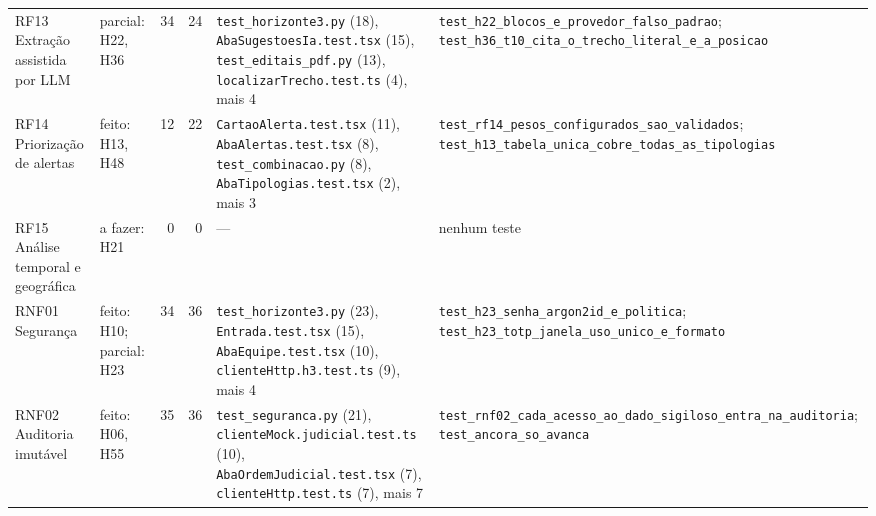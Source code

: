 \begin{scriptsize}
\begin{longtable}{>{\raggedright\arraybackslash}p{2.5cm}>{\raggedright\arraybackslash}p{1.9cm}rr>{\raggedright\arraybackslash}p{3.3cm}>{\raggedright\arraybackslash}p{4.5cm}}
RF13 Extração assistida por LLM & parcial: H22, H36 & 34 & 24 & \texttt{test\_\allowbreak{}horizonte3.\allowbreak{}py} (18), \texttt{AbaSugestoesIa.\allowbreak{}test.\allowbreak{}tsx} (15), \texttt{test\_\allowbreak{}editais\_\allowbreak{}pdf.\allowbreak{}py} (13), \texttt{localizarTrecho.\allowbreak{}test.\allowbreak{}ts} (4), mais 4 & \texttt{test\_\allowbreak{}h22\_\allowbreak{}blocos\_\allowbreak{}e\_\allowbreak{}provedor\_\allowbreak{}falso\_\allowbreak{}padrao}; \texttt{test\_\allowbreak{}h36\_\allowbreak{}t10\_\allowbreak{}cita\_\allowbreak{}o\_\allowbreak{}trecho\_\allowbreak{}literal\_\allowbreak{}e\_\allowbreak{}a\_\allowbreak{}posicao} \\
RF14 Priorização de alertas & feito: H13, H48 & 12 & 22 & \texttt{CartaoAlerta.\allowbreak{}test.\allowbreak{}tsx} (11), \texttt{AbaAlertas.\allowbreak{}test.\allowbreak{}tsx} (8), \texttt{test\_\allowbreak{}combinacao.\allowbreak{}py} (8), \texttt{AbaTipologias.\allowbreak{}test.\allowbreak{}tsx} (2), mais 3 & \texttt{test\_\allowbreak{}rf14\_\allowbreak{}pesos\_\allowbreak{}configurados\_\allowbreak{}sao\_\allowbreak{}validados}; \texttt{test\_\allowbreak{}h13\_\allowbreak{}tabela\_\allowbreak{}unica\_\allowbreak{}cobre\_\allowbreak{}todas\_\allowbreak{}as\_\allowbreak{}tipologias} \\
RF15 Análise temporal e geográfica & a fazer: H21 & 0 & 0 & --- & nenhum teste \\
RNF01 Segurança & feito: H10; parcial: H23 & 34 & 36 & \texttt{test\_\allowbreak{}horizonte3.\allowbreak{}py} (23), \texttt{Entrada.\allowbreak{}test.\allowbreak{}tsx} (15), \texttt{AbaEquipe.\allowbreak{}test.\allowbreak{}tsx} (10), \texttt{clienteHttp.\allowbreak{}h3.\allowbreak{}test.\allowbreak{}ts} (9), mais 4 & \texttt{test\_\allowbreak{}h23\_\allowbreak{}senha\_\allowbreak{}argon2id\_\allowbreak{}e\_\allowbreak{}politica}; \texttt{test\_\allowbreak{}h23\_\allowbreak{}totp\_\allowbreak{}janela\_\allowbreak{}uso\_\allowbreak{}unico\_\allowbreak{}e\_\allowbreak{}formato} \\
RNF02 Auditoria imutável & feito: H06, H55 & 35 & 36 & \texttt{test\_\allowbreak{}seguranca.\allowbreak{}py} (21), \texttt{clienteMock.\allowbreak{}judicial.\allowbreak{}test.\allowbreak{}ts} (10), \texttt{AbaOrdemJudicial.\allowbreak{}test.\allowbreak{}tsx} (7), \texttt{clienteHttp.\allowbreak{}test.\allowbreak{}ts} (7), mais 7 & \texttt{test\_\allowbreak{}rnf02\_\allowbreak{}cada\_\allowbreak{}acesso\_\allowbreak{}ao\_\allowbreak{}dado\_\allowbreak{}sigiloso\_\allowbreak{}entra\_\allowbreak{}na\_\allowbreak{}auditoria}; \texttt{test\_\allowbreak{}ancora\_\allowbreak{}so\_\allowbreak{}avanca} \\

\end{longtable}
\end{scriptsize}
